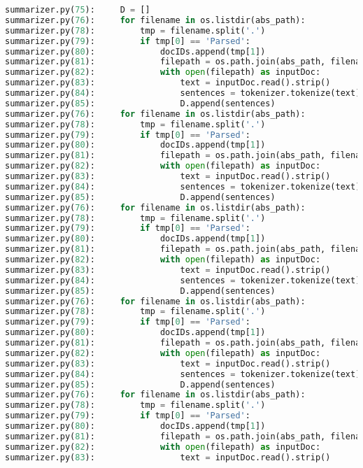 \documentclass[11pt]{article}
\begin{document}
\begin{lstlisting}[language=Python]
summarizer.py(75):     D = []
summarizer.py(76):     for filename in os.listdir(abs_path):
summarizer.py(78):         tmp = filename.split('.')
summarizer.py(79):         if tmp[0] == 'Parsed':
summarizer.py(80):             docIDs.append(tmp[1])
summarizer.py(81):             filepath = os.path.join(abs_path, filename)
summarizer.py(82):             with open(filepath) as inputDoc:
summarizer.py(83):                 text = inputDoc.read().strip()
summarizer.py(84):                 sentences = tokenizer.tokenize(text)
summarizer.py(85):                 D.append(sentences)
summarizer.py(76):     for filename in os.listdir(abs_path):
summarizer.py(78):         tmp = filename.split('.')
summarizer.py(79):         if tmp[0] == 'Parsed':
summarizer.py(80):             docIDs.append(tmp[1])
summarizer.py(81):             filepath = os.path.join(abs_path, filename)
summarizer.py(82):             with open(filepath) as inputDoc:
summarizer.py(83):                 text = inputDoc.read().strip()
summarizer.py(84):                 sentences = tokenizer.tokenize(text)
summarizer.py(85):                 D.append(sentences)
summarizer.py(76):     for filename in os.listdir(abs_path):
summarizer.py(78):         tmp = filename.split('.')
summarizer.py(79):         if tmp[0] == 'Parsed':
summarizer.py(80):             docIDs.append(tmp[1])
summarizer.py(81):             filepath = os.path.join(abs_path, filename)
summarizer.py(82):             with open(filepath) as inputDoc:
summarizer.py(83):                 text = inputDoc.read().strip()
summarizer.py(84):                 sentences = tokenizer.tokenize(text)
summarizer.py(85):                 D.append(sentences)
summarizer.py(76):     for filename in os.listdir(abs_path):
summarizer.py(78):         tmp = filename.split('.')
summarizer.py(79):         if tmp[0] == 'Parsed':
summarizer.py(80):             docIDs.append(tmp[1])
summarizer.py(81):             filepath = os.path.join(abs_path, filename)
summarizer.py(82):             with open(filepath) as inputDoc:
summarizer.py(83):                 text = inputDoc.read().strip()
summarizer.py(84):                 sentences = tokenizer.tokenize(text)
summarizer.py(85):                 D.append(sentences)
summarizer.py(76):     for filename in os.listdir(abs_path):
summarizer.py(78):         tmp = filename.split('.')
summarizer.py(79):         if tmp[0] == 'Parsed':
summarizer.py(80):             docIDs.append(tmp[1])
summarizer.py(81):             filepath = os.path.join(abs_path, filename)
summarizer.py(82):             with open(filepath) as inputDoc:
summarizer.py(83):                 text = inputDoc.read().strip()

\end{lstlisting}
\end{document}
